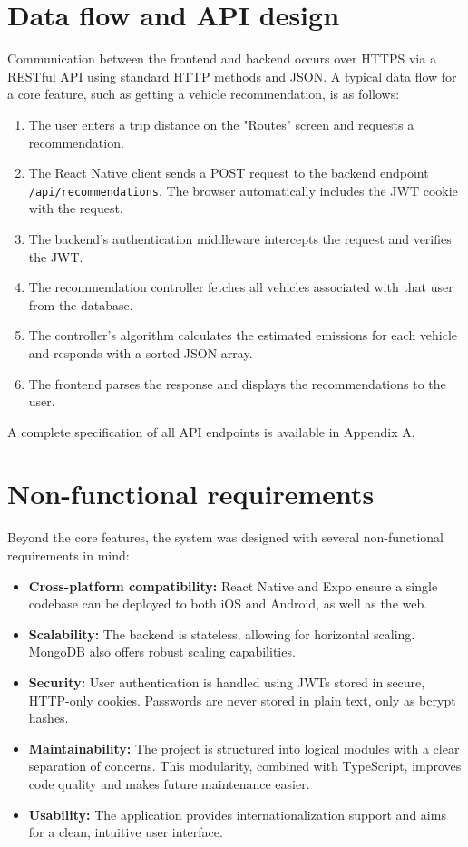 \section{Data flow and API design}
Communication between the frontend and backend occurs over HTTPS via a RESTful API using standard HTTP methods and JSON. A typical data flow for a core feature, such as getting a vehicle recommendation, is as follows:
\begin{enumerate}
    \item The user enters a trip distance on the "Routes" screen and requests a recommendation.
    \item The React Native client sends a POST request to the backend endpoint \texttt{/api/recommendations}. The browser automatically includes the JWT cookie with the request.
    \item The backend's authentication middleware intercepts the request and verifies the JWT.
    \item The recommendation controller fetches all vehicles associated with that user from the database.
    \item The controller's algorithm calculates the estimated emissions for each vehicle and responds with a sorted JSON array.
    \item The frontend parses the response and displays the recommendations to the user.
\end{enumerate}
A complete specification of all API endpoints is available in Appendix A.

\section{Non-functional requirements}
Beyond the core features, the system was designed with several non-functional requirements in mind:
\begin{itemize}
    \item \textbf{Cross-platform compatibility:} React Native and Expo ensure a single codebase can be deployed to both iOS and Android, as well as the web.
    \item \textbf{Scalability:} The backend is stateless, allowing for horizontal scaling. MongoDB also offers robust scaling capabilities.
    \item \textbf{Security:} User authentication is handled using JWTs stored in secure, HTTP-only cookies. Passwords are never stored in plain text, only as bcrypt hashes.
    \item \textbf{Maintainability:} The project is structured into logical modules with a clear separation of concerns. This modularity, combined with TypeScript, improves code quality and makes future maintenance easier.
    \item \textbf{Usability:} The application provides internationalization support and aims for a clean, intuitive user interface.
\end{itemize}

